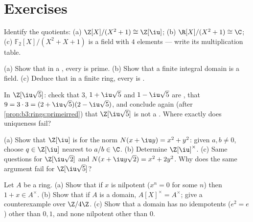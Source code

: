 \section{Exercises}

\begin{exercise}[$\star$]\label{exo:b3:rings:1}
Identify the quotients: (a) $\Z[X]/(X^2 + 1) \cong \Z[\iu]$;
(b) $\R[X]/(X^2+1) \cong \C$; (c) $\mathbb F_2[X]/(X^2 + X + 1)$
is a field with $4$ elements --- write its multiplication table.
\end{exercise}

\begin{exercise}[$\star$]\label{exo:b3:rings:2}
(a) Show that in a , every  is prime.
(b) Show that a finite integral domain is a field.
(c) Deduce that in a finite ring, every  is .
\end{exercise}

\begin{exercise}[$\star$]\label{exo:b3:rings:3}
In $\Z[\iu\sqrt5]$: check that $3$, $1 + \iu\sqrt5$ and $1 -
\iu\sqrt5$ are , that $9 = 3\cdot 3 = (2 +
\iu\sqrt5)(2 - \iu\sqrt5)$, and conclude again (after
\cref{prop:b3:rings:primeirred}) that $\Z[\iu\sqrt5]$ is not a
. Where exactly does uniqueness fail?
\end{exercise}

\begin{exercise}[$\star\star$]\label{exo:b3:rings:4}
(a) Show that $\Z[\iu]$ is  for the norm $N(x + \iu y) =
x^2 + y^2$: given $a, b \neq 0$, choose $q \in \Z[\iu]$ nearest
to $a/b \in \C$.
(b) Determine $\Z[\iu]^\times$.
(c) Same questions for $\Z[\iu\sqrt2]$ and $N(x + \iu y\sqrt2) =
x^2 + 2y^2$. Why does the same argument fail for
$\Z[\iu\sqrt5]$?
\end{exercise}

\begin{exercise}[$\star\star$]\label{exo:b3:rings:5}
Let $A$ be a ring. (a) Show that if $x$ is nilpotent ($x^n = 0$
for some $n$) then $1 + x \in A^\times$. (b) Show that if $A$ is
a domain, $A[X]^\times = A^\times$; give a counterexample over
$\Z/4\Z$. (c) Show that a domain has no idempotents ($e^2 = e$)
other than $0, 1$, and none nilpotent other than $0$.
\end{exercise}

